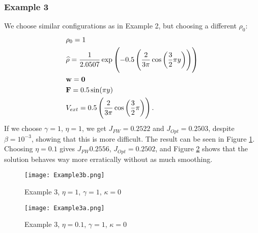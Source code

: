 \subsubsection{Example 3}
We choose similar configurations as in Example 2, but choosing a different $\rho_0$:
\begin{align*}
&\rho_0 = 1\\
&\widehat \rho = \frac{1}{2.0507} \exp\left(-0.5\left(\frac{2}{3 \pi}\cos\left(\frac{3}{2}\pi y\right)\right) \right)\\
&\mathbf{w} = \mathbf 0 \\
&\mathbf{F} = 0.5 \sin(\pi y)\\
&V_{ext} = 0.5 \left(\frac{2}{3 \pi}\cos\left(\frac{3}{2}\pi \right) \right).
\end{align*}
If we choose $\gamma = 1$, $\eta = 1$, we get $J_{FW} = 0.2522$ and $J_{Opt} = 0.2503$, despite $\beta = 10^{-3}$, showing that this is more difficult. The result can be seen in Figure \ref{F6}. 
Choosing $\eta = 0.1$ gives $J_{FW} 0.2556$, $J_{Opt} = 0.2502$, and Figure \ref{F7} shows that the solution behaves way more erratically without as much smoothing.
\begin{figure}[h]
	\centering
	\texttt{[image: Example3b.png]}
	\caption{Example 3, $\eta = 1$, $\gamma = 1$, $\kappa = 0$} 
	\label{F6}
\end{figure}

\begin{figure}[h]
	\centering
	\texttt{[image: Example3a.png]}
	\caption{Example 3, $\eta = 0.1$, $\gamma = 1$, $\kappa = 0$} 
	\label{F7}
\end{figure}